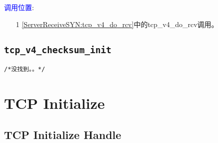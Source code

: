             \textcolor{blue}{调用位置}:

                \begin{enumerate}
                    \item[1]        \ref{ServerReceiveSYN:tcp_v4_do_rcv}中的tcp\_v4\_do\_rcv调用。
                \end{enumerate}
            
    \subsection{\texttt{tcp_v4_checksum_init}}
\begin{verbatim}
/*没找到。。*/
\end{verbatim}

\section{TCP Initialize}
	\subsection{TCP Initialize Handle}
